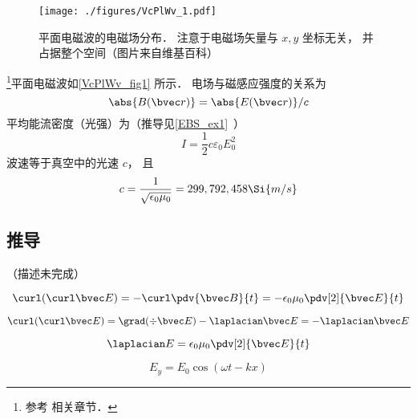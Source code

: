 

\begin{figure}[ht]
\centering
\texttt{[image: ./figures/VcPlWv\_1.pdf]}
\caption{平面电磁波的电磁场分布． 注意于电磁场矢量与 $x, y$ 坐标无关， 并占据整个空间（图片来自维基百科）} \label{VcPlWv_fig1}
\end{figure}

\footnote{参考 \cite{GriffE} 相关章节．}平面电磁波如\autoref{VcPlWv_fig1} 所示． 电场与磁感应强度的关系为
\begin{equation}
\abs{B(\bvec r)} = \abs{E(\bvec r)}/c
\end{equation}
平均能流密度（光强）为（推导见\autoref{EBS_ex1}~）
\begin{equation}
I = \frac12 c\varepsilon_0 E_0^2
\end{equation}
波速等于真空中的光速 $c$， 且
\begin{equation}\label{VcPlWv_eq1}
c = \frac{1}{\sqrt{\epsilon_0\mu_0}} = 299,792,458 \Si{m/s}
\end{equation}

\subsection{推导}
（描述未完成）

\begin{equation}
\curl(\curl \bvec E) = -\curl\pdv{\bvec B}{t} = -\epsilon_0\mu_0 \pdv[2]{\bvec E}{t}
\end{equation}

\begin{equation}
\curl(\curl \bvec E) = \grad(\div \bvec E) - \laplacian \bvec E = - \laplacian \bvec E
\end{equation}

\begin{equation}
\laplacian E = \epsilon_0 \mu_0 \pdv[2]{\bvec E}{t}
\end{equation}

\begin{equation}
E_y = E_0\cos(\omega t - kx)
\end{equation}
